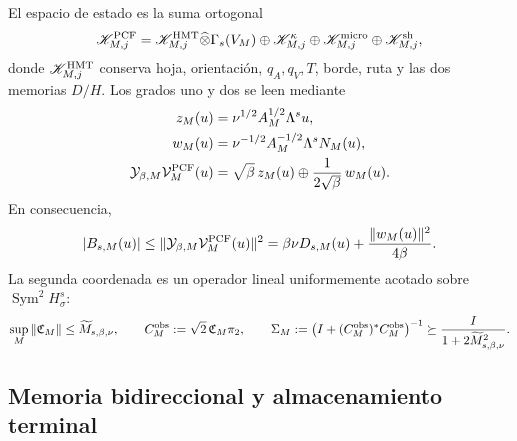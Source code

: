 El espacio de estado es la suma ortogonal
\begin{equation}
 \mathscr K_{M,j}^{\rm PCF}
 =\mathscr K_{M,j}^{\rm HMT}\widehat\otimes\Gamma_s(V_M)
 \oplus\mathscr K_{M,j}^{\kappa}
 \oplus\mathscr K_{M,j}^{\rm micro}
 \oplus\mathscr K_{M,j}^{\rm sh},
 \label{eq:ns-import-full-carrier}
\end{equation}
donde \(\mathscr K_{M,j}^{\rm HMT}\) conserva hoja, orientación,
\(q_A,q_V,T\), borde, ruta y las dos memorias \(D/H\). Los grados uno y dos
se leen mediante
\begin{equation}
 \begin{aligned}
 z_M(u)&=\nu^{1/2}A_M^{1/2}\Lambda^su,\\
 w_M(u)&=\nu^{-1/2}A_M^{-1/2}\Lambda^sN_M(u),\\
 \mathcal Y_{\beta,M}\mathcal V_M^{\rm PCF}(u)
 &=\sqrt\beta\,z_M(u)
   \oplus\frac{1}{2\sqrt\beta}\,w_M(u).
 \end{aligned}
 \label{eq:ns-import-degree-one-two-reader}
\end{equation}
En consecuencia,
\begin{equation}
 |B_{s,M}(u)|
 \le
 \|\mathcal Y_{\beta,M}\mathcal V_M^{\rm PCF}(u)\|^2
 =\beta\nu D_{s,M}(u)+\frac{\|w_M(u)\|^2}{4\beta}.
 \label{eq:ns-import-young-port}
\end{equation}
La segunda coordenada es un operador lineal uniformemente acotado sobre
\(\operatorname{Sym}^2H^s_\sigma\):
\begin{equation}
 \sup_M\|\mathfrak C_M\|
 \le\widetilde M_{s,\beta,\nu},
 \qquad
 C_M^{\rm obs}:=\sqrt2\,\mathfrak C_M\pi_2,
 \qquad
 \Sigma_M:=\bigl(I+(C_M^{\rm obs})^*C_M^{\rm obs}\bigr)^{-1}
 \succeq\frac{I}{1+2\widetilde M_{s,\beta,\nu}^2}.
 \label{eq:ns-import-uniform-graph}
\end{equation}

\subsection{Memoria bidireccional y almacenamiento terminal}

